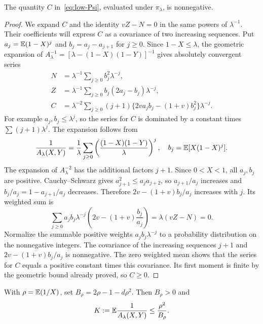 \begin{lemma}\label{lem:Cpositive}
The quantity $C$ in~\eqref{eq:low-Psi}, evaluated under $\pi_\lambda$, is nonnegative.
\end{lemma}

\begin{proof}
We expand $C$ and the identity $vZ-N=0$ in the same powers of $\lambda^{-1}$. Their coefficients will express $C$ as a covariance of two increasing sequences. Put $a_j=\mathbb E(1-X)^j$ and $b_j=a_j-a_{j+1}$ for $j\ge0$. Since $1-X\le\lambda$, the geometric expansion of $A_\lambda^{-1}=[\lambda-(1-X)(1-Y)]^{-1}$ gives absolutely convergent series
\begin{align*}
 N&=\lambda^{-1}\sum_{j\ge0}b_j^2\lambda^{-j},\\
 Z&=\lambda^{-1}\sum_{j\ge0}b_j(2a_j-b_j)\lambda^{-j},\\
 C&=\lambda^{-2}\sum_{j\ge0}(j+1)
 \{2va_jb_j-(1+v)b_j^2\}\lambda^{-j}.
\end{align*}
For example $a_j,b_j\le\lambda^j$, so the series for $C$ is dominated by a constant times $\sum(j+1)\lambda^j$. The expansion follows from
\[
 \frac1{A_\lambda(X,Y)}=\frac1\lambda
 \sum_{j\ge0}\left(\frac{(1-X)(1-Y)}\lambda\right)^j,
 \quad b_j=\mathbb E[X(1-X)^j].
\]
The expansion of $A_\lambda^{-2}$ has the additional factors $j+1$. Since $0<X<1$, all $a_j,b_j$ are positive. Cauchy--Schwarz gives $a_{j+1}^2\le a_ja_{j+2}$, so $a_{j+1}/a_j$ increases and $b_j/a_j=1-a_{j+1}/a_j$ decreases. Therefore $2v-(1+v)b_j/a_j$ increases with $j$. Its weighted sum is
\[
 \sum_{j\ge0}a_jb_j\lambda^{-j}
 \left(2v-(1+v)\frac{b_j}{a_j}\right)
 =\lambda(vZ-N)=0.
\]
Normalize the summable positive weights $a_jb_j\lambda^{-j}$ to a probability distribution on the nonnegative integers. The covariance of the increasing sequences $j+1$ and $2v-(1+v)b_j/a_j$ is nonnegative. The zero weighted mean shows that the series for $C$ equals a positive constant times this covariance. Its first moment is finite by the geometric bound already proved, so $C\ge0$.
\end{proof}

\begin{lemma}\label{lem:reciprocal}
With $\rho=\mathbb E(1/X)$, set $B_\rho=2\rho-1-d\rho^2$. Then $B_\rho>0$ and
\begin{equation}\label{eq:reciprocal}
 K:=\mathbb E\frac1{A_\lambda(X,Y)}\le\frac{\rho^2}{B_\rho}.
\end{equation}
\end{lemma}

